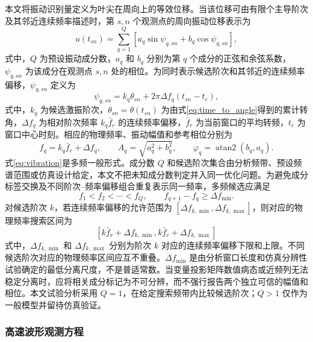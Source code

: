 \documentclass[UTF8,12pt,a4paper]{ctexart}
\begin{document}
本文将振动识别量定义为叶尖在周向上的等效位移。当该位移可由有限个主导阶次及其邻近连续频率描述时，第 $s,n$ 个观测点的周向振动位移表示为
\begin{equation}
u(t_{sn})=\sum_{q=1}^{Q}
\left[
a_q\sin\psi_{q,sn}+b_q\cos\psi_{q,sn}
\right],
\label{eq:vibration}
\end{equation}
式中，$Q$ 为预设振动成分数，$a_q$ 和 $b_q$ 分别为第 $q$ 个成分的正弦和余弦系数，$\psi_{q,sn}$ 为该成分在观测点 $s,n$ 处的相位。为同时表示候选阶次和其邻近的连续频率偏移，$\psi_{q,sn}$ 定义为
\begin{equation}
\psi_{q,sn}
=k_q\theta_{sn}
+2\pi\Delta f_q(t_{sn}-t_c),
\label{eq:vibration_phase}
\end{equation}
式中，$k_q$ 为候选激振阶次，$\theta_{sn}=\theta(t_{sn})$ 为由式\eqref{eq:time_to_angle}得到的累计转角，$\Delta f_q$ 为相对阶次频率 $k_q\bar f_r$ 的连续频率偏移，$\bar f_r$ 为当前窗口的平均转频，$t_c$ 为窗口中心时刻。相应的物理频率、振动幅值和参考相位分别为
\begin{equation}
f_q=k_q\bar f_r+\Delta f_q,
\qquad
A_q=\sqrt{a_q^2+b_q^2},
\qquad
\varphi_q=\operatorname{atan2}(b_q,a_q).
\label{eq:amp_phase}
\end{equation}
式\eqref{eq:vibration}是多频一般形式。成分数 $Q$ 和候选阶次集合由分析频带、预设频谱范围或仿真设计给定，本文不把未知成分数判定并入同一优化问题。为避免成分标签交换及不同阶次--频率偏移组合重复表示同一频率，多频候选应满足
\begin{equation}
f_1<f_2<\cdots<f_Q,
\qquad
f_{q+1}-f_q\geq\Delta f_{\min}.
\label{eq:multifrequency_constraints}
\end{equation}
对候选阶次 $k$，若连续频率偏移的允许范围为 $[\Delta f_{k,\min},\Delta f_{k,\max}]$，则对应的物理频率搜索区间为
\begin{equation}
\left[
k\bar f_r+\Delta f_{k,\min},
k\bar f_r+\Delta f_{k,\max}
\right]
\label{eq:physical_frequency_interval}
\end{equation}
式中，$\Delta f_{k,\min}$ 和 $\Delta f_{k,\max}$ 分别为阶次 $k$ 对应的连续频率偏移下限和上限。不同候选阶次对应的物理频率区间应互不重叠。$\Delta f_{\min}$ 是由分析窗口长度和仿真分辨性试验确定的最低分离尺度，不是普适常数。当变量投影矩阵数值病态或近频列无法稳定分离时，应将相关成分标记为不可分辨，而不强行报告两个独立可信的幅值和相位。本文试验分析采用 $Q=1$，在给定搜索频带内比较候选阶次；$Q>1$ 仅作为一般模型并留待仿真验证。

\subsubsection{高速波形观测方程}
\end{document}
